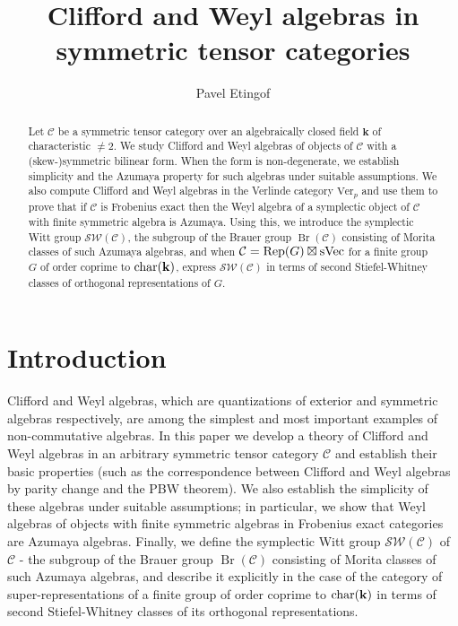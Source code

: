 \documentclass[12pt]{amsart}
\numberwithin{equation}{section}
\providecommand{\k}{}\renewcommand{\k}{\mathbf{k}}
\providecommand{\C}{}\renewcommand{\C}{\mathcal{C}}
\providecommand{\sVec}{}\renewcommand{\sVec}{\mathrm{sVec}}
\providecommand{\Ver}{}\renewcommand{\Ver}{\mathrm{Ver}}
\providecommand{\Br}{}\renewcommand{\Br}{\operatorname{Br}}
\theoremstyle{plain}
\theoremstyle{definition}
\theoremstyle{remark}
\begin{document}
\title{Clifford and Weyl algebras in symmetric tensor categories}

\author{Pavel Etingof}
\address{Department of Mathematics,
Massachusetts Institute of Technology,
77 Massachusetts Avenue,
Cambridge, MA 02139,
USA
}


\begin{abstract} Let $\C$ be a symmetric tensor category over an algebraically closed field $\k$ of characteristic $\ne 2$. We study Clifford and Weyl algebras of objects of $\C$ with a (skew-)symmetric bilinear form. When the form is non-degenerate, we establish simplicity and the Azumaya property for such algebras under suitable assumptions. We also compute Clifford and Weyl algebras in the Verlinde category $\Ver_p$ and use them to prove that if $\C$ is Frobenius exact then the Weyl algebra of a symplectic object of $\C$ with finite symmetric algebra is Azumaya.  Using this, we introduce the symplectic Witt group $\mathcal S\mathcal W(\C)$, the subgroup of the Brauer group $\Br(\C)$ consisting of Morita classes of such Azumaya algebras, and when $\C={\rm Rep}(G)\boxtimes\sVec$ for a finite group $G$ of order coprime to ${\rm char}(\k)$, express $\mathcal S\mathcal W(\C)$ in terms of second Stiefel-Whitney classes of orthogonal representations of $G$.
\end{abstract}


\maketitle

\tableofcontents

\section{Introduction} 

Clifford and Weyl algebras, which are quantizations of exterior and symmetric algebras respectively, are among the simplest and most important examples of non-commutative algebras. In this paper we develop a theory of Clifford and Weyl algebras in an arbitrary symmetric tensor category $\C$ and establish their basic properties (such as the  correspondence between Clifford and Weyl algebras by parity change and the PBW theorem). We also establish the simplicity of these algebras under suitable assumptions; in particular, we show that Weyl algebras of objects with finite symmetric algebras in Frobenius exact categories are Azumaya algebras. Finally, we define the symplectic Witt group $\mathcal S\mathcal W(\C)$ of $\C$ - the subgroup of the Brauer group $\Br(\C)$ consisting of Morita classes of such Azumaya algebras, 
and describe it explicitly in the case of the category of super-representations of a finite group of order coprime to ${\rm char}(\k)$ in terms of second Stiefel-Whitney classes of its orthogonal representations. 
\end{document}
